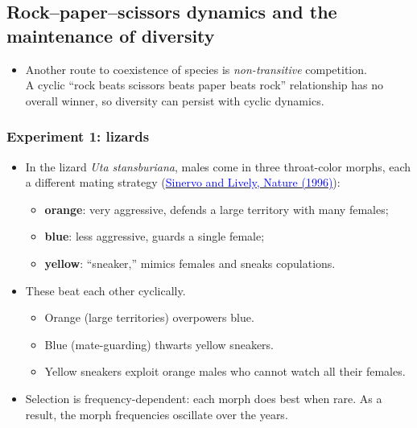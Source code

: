 \documentclass[20pt]{extarticle}
\newcommand{\hrefc}[2]{\href{#1}{\textcolor{blue}{#2}}}
\begin{document}
\subsection*{Rock--paper--scissors dynamics and the maintenance of diversity}

\begin{itemize}
\item Another route to coexistence of species is \emph{non-transitive} competition.\\
A cyclic ``rock beats scissors beats paper beats rock'' relationship has no overall winner, so diversity can persist with cyclic dynamics.
\end{itemize}

\subsubsection*{Experiment 1: lizards}

\begin{itemize}
\item In the lizard \textit{Uta stansburiana}, males come in three throat-color morphs, each a different mating strategy (\hrefc{https://doi.org/10.1038/380240a0}{Sinervo and Lively, Nature (1996)}):
	\begin{itemize}
	\item \textbf{orange}: very aggressive, defends a large territory with many females;
	\item \textbf{blue}: less aggressive, guards a single female;
	\item \textbf{yellow}: ``sneaker,'' mimics females and sneaks copulations.
	\end{itemize}
\item These beat each other cyclically.
	\begin{itemize}
	\item Orange (large territories) overpowers blue.
	\item Blue (mate-guarding) thwarts yellow sneakers.
	\item Yellow sneakers exploit orange males who cannot watch all their females.
	\end{itemize}
\item Selection is frequency-dependent: each morph does best when rare. As a result, the morph frequencies oscillate over the years.
\end{itemize}
\end{document}
